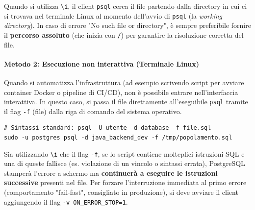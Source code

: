 \begin{tip}
Quando si utilizza \texttt{\textbackslash i}, il client \texttt{psql} cerca il file partendo dalla directory in cui ci si trovava nel terminale Linux al momento dell'avvio di \texttt{psql} (la \textit{working directory}). In caso di errore "No such file or directory", è sempre preferibile fornire il \textbf{percorso assoluto} (che inizia con \texttt{/}) per garantire la risoluzione corretta del file.
\end{tip}

\paragraph{Metodo 2: Esecuzione non interattiva (Terminale Linux)}
Quando si automatizza l'infrastruttura (ad esempio scrivendo script per avviare container Docker o pipeline di CI/CD), non è possibile entrare nell'interfaccia interattiva. In questo caso, si passa il file direttamente all'eseguibile \texttt{psql} tramite il flag \texttt{-f} (file) dalla riga di comando del sistema operativo.

\begin{lstlisting}[language=TerminalBash, title=Esecuzione batch da riga di comando]
# Sintassi standard: psql -U utente -d database -f file.sql
sudo -u postgres psql -d java_backend_dev -f /tmp/popolamento.sql
\end{lstlisting}

\begin{tip}
Sia utilizzando \texttt{\textbackslash i} che il flag \texttt{-f}, se lo script contiene molteplici istruzioni SQL e una di queste fallisce (es. violazione di un vincolo o sintassi errata), PostgreSQL stamperà l'errore a schermo ma \textbf{continuerà a eseguire le istruzioni successive} presenti nel file. Per forzare l'interruzione immediata al primo errore (comportamento "fail-fast", consigliato in produzione), si deve avviare il client aggiungendo il flag \texttt{-v ON\_ERROR\_STOP=1}.
\end{tip}

